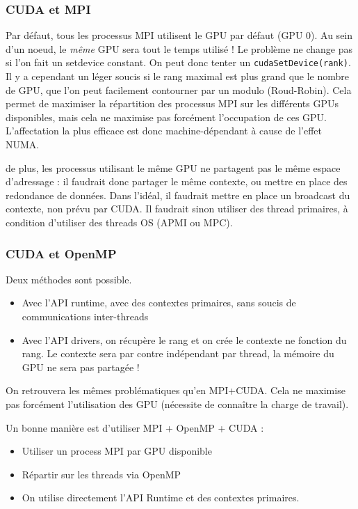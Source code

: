 \documentclass{article}
\begin{document}
\subsubsection{CUDA et MPI}

Par défaut, tous les processus MPI utilisent le GPU par défaut (GPU 0). Au sein d'un noeud, le \emph{même} GPU sera tout le temps utilisé ! Le problème ne change pas si l'on fait un setdevice constant. On peut donc tenter un \texttt{cudaSetDevice(rank)}. Il y a cependant un léger soucis si le rang maximal est plus grand que le nombre de GPU, que l'on peut facilement contourner par un modulo (Roud-Robin). Cela permet de maximiser la répartition des processus MPI sur les différents GPUs disponibles, mais cela ne maximise pas forcément l'occupation de ces GPU. L'affectation la plus efficace est donc machine-dépendant à cause de l'effet NUMA.

de plus, les processus utilisant le même GPU ne partagent pas le même espace d'adressage : il faudrait donc partager le même contexte, ou mettre en place des redondance de données. Dans l'idéal, il faudrait mettre en place un broadcast du contexte, non prévu par CUDA. Il faudrait sinon utiliser des thread primaires, à condition d'utiliser des threads OS (APMI ou MPC).

\subsubsection{CUDA et OpenMP}
Deux méthodes sont possible.
\begin{itemize}
\item Avec l'API runtime, avec des contextes primaires, sans soucis de communications inter-threads
\item Avec l'API drivers, on récupère le rang et on crée le contexte ne fonction du rang. Le contexte sera par contre indépendant par thread, la mémoire du GPU ne sera pas partagée !
\end{itemize}

On retrouvera les mêmes problématiques qu'en MPI+CUDA. Cela ne maximise pas forcément l'utilisation des GPU (nécessite de connaître la charge de travail).

Un bonne manière est d'utiliser MPI + OpenMP + CUDA :
\begin{itemize}
\item Utiliser un process MPI par GPU disponible
\item Répartir sur les threads via OpenMP
\item On utilise directement l'API Runtime et des contextes primaires.
\end{itemize}
\end{document}
